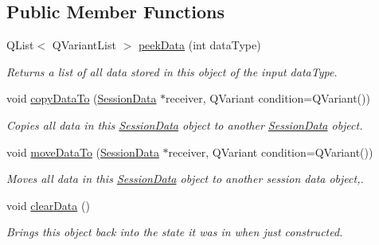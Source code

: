 \subsection*{Public Member Functions}
\begin{DoxyCompactItemize}
\item 
\hypertarget{class_session_data_a5eb5642f14a897c65c31319580b23d5d}{Q\-List$<$ Q\-Variant\-List $>$ \hyperlink{class_session_data_a5eb5642f14a897c65c31319580b23d5d}{peek\-Data} (int data\-Type)}\label{class_session_data_a5eb5642f14a897c65c31319580b23d5d}

\begin{DoxyCompactList}\small\item\em Returns a list of all data stored in this object of the input data\-Type. \end{DoxyCompactList}\item 
void \hyperlink{class_session_data_a20863a2b54c30b1043ff4a87a9908ba9}{copy\-Data\-To} (\hyperlink{class_session_data}{Session\-Data} $\ast$receiver, Q\-Variant condition=Q\-Variant())
\begin{DoxyCompactList}\small\item\em Copies all data in this \hyperlink{class_session_data}{Session\-Data} object to another \hyperlink{class_session_data}{Session\-Data} object. \end{DoxyCompactList}\item 
void \hyperlink{class_session_data_a15c17ef02068f6ec8bf717044c21b487}{move\-Data\-To} (\hyperlink{class_session_data}{Session\-Data} $\ast$receiver, Q\-Variant condition=Q\-Variant())
\begin{DoxyCompactList}\small\item\em Moves all data in this \hyperlink{class_session_data}{Session\-Data} object to another session data object,. \end{DoxyCompactList}\item 
\hypertarget{class_session_data_a36792a7f432c4d8e640a0da5e1aaebbc}{void \hyperlink{class_session_data_a36792a7f432c4d8e640a0da5e1aaebbc}{clear\-Data} ()}\label{class_session_data_a36792a7f432c4d8e640a0da5e1aaebbc}

\begin{DoxyCompactList}\small\item\em Brings this object back into the state it was in when just constructed. \end{DoxyCompactList}\end{DoxyCompactItemize}
